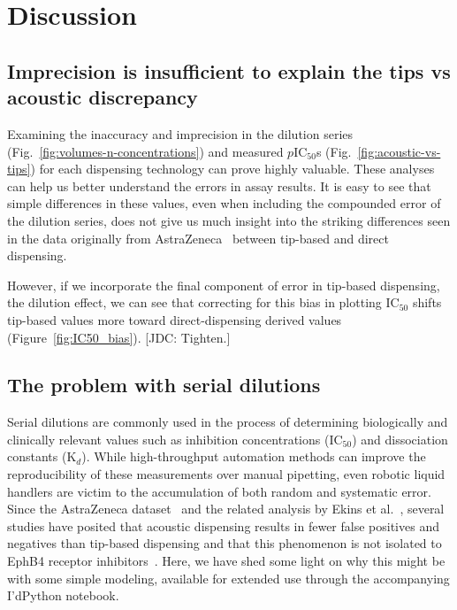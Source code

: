 \documentclass[aps,pre,twocolumn,nofootinbib,superscriptaddress,linenumbers]{revtex4-1}
\begin{document}
\section{Discussion}

\subsection*{Imprecision is insufficient to explain the tips vs acoustic discrepancy}

Examining the inaccuracy and imprecision in the dilution series (Fig.~\ref{fig:volumes-n-concentrations}) and measured $p$IC$_{50}$s (Fig.~\ref{fig:acoustic-vs-tips}) for each dispensing technology can prove highly valuable.
These analyses can help us better understand the errors in assay results.
It is easy to see that simple differences in these values, even when including the compounded error of the dilution series, does not give us much insight into the striking differences seen in the data originally from AstraZeneca~\cite{ekins_dispensing_2013,barlaam_novel_2009,barlaam_pyrimidine_2010} between tip-based and direct dispensing.

However, if we incorporate the final component of error in tip-based dispensing, the dilution effect, we can see that correcting for this bias in plotting IC$_{50}$ shifts tip-based values more toward direct-dispensing derived values (Figure~\ref{fig:IC50_bias}).
{\color{red}[JDC: Tighten.]}

\subsection*{The problem with serial dilutions}

Serial dilutions are commonly used in the process of determining biologically and clinically relevant values such as inhibition concentrations (IC$_{ 50}$)  and dissociation constants (K$_{d}$). 
While high-throughput automation methods can improve the reproducibility of these measurements over manual pipetting, even robotic liquid handlers are victim to the accumulation of both random and systematic error.
Since the AstraZeneca dataset~\cite{barlaam_novel_2009,barlaam_pyrimidine_2010} and the related analysis by Ekins et al.~\cite{ekins_dispensing_2013}, several studies have posited that acoustic dispensing results in fewer false positives and negatives than tip-based dispensing and that this phenomenon is not isolated to EphB4 receptor inhibitors~\cite{wingfield_impact_2012,olechno_direct_2013,olechno_sound_2013,olechno_improving_2006}. 
Here, we have shed some light on why this might be with some simple modeling, available for extended use through the accompanying I'dPython notebook.
\end{document}
